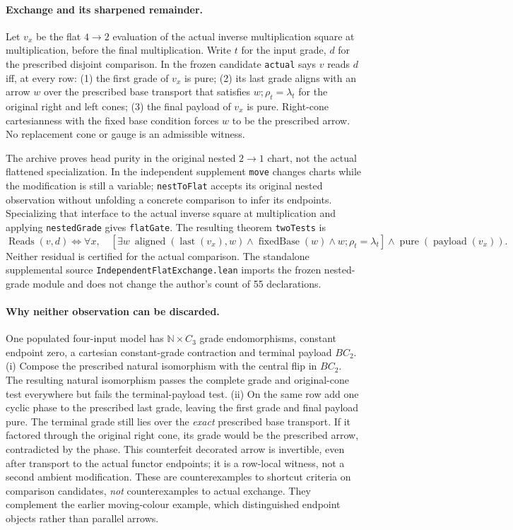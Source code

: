 \documentclass[10pt]{article}
\newcommand{\code}{\nolinkurl}\setlength{\emergencystretch}{3em}
\begin{document}
\paragraph{Exchange and its sharpened remainder.} Let $v_x$ be the flat $4\to2$ evaluation of the actual inverse multiplication square at multiplication, before the final multiplication. Write $t$ for the input grade, $d$ for the prescribed disjoint comparison. In the frozen candidate \code{actual} says $v$ reads $d$ iff, at every row: (1) the first grade of $v_x$ is pure; (2) its last grade aligns with an arrow $w$ over the prescribed base transport that satisfies $w;\rho_t=\lambda_t$ for the original right and left cones; (3) the final payload of $v_x$ is pure. Right-cone cartesianness with the fixed base condition forces $w$ to be the prescribed arrow. No replacement cone or gauge is an admissible witness.
\par The archive proves head purity in the original nested $2\to1$ chart, not the actual flattened specialization. In the independent supplement \code{move} changes charts while the modification is still a variable; \code{nestToFlat} accepts its original nested observation without unfolding a concrete comparison to infer its endpoints. Specializing that interface to the actual inverse square at multiplication and applying \code{nestedGrade} gives \code{flatGate}. The resulting theorem \code{twoTests} is
\[
 \operatorname{Reads}(v,d)\iff \forall x,\quad
 \left[\exists w\ \operatorname{aligned}(\operatorname{last}(v_x),w)
 \land\operatorname{fixedBase}(w)\land w;\rho_t=\lambda_t\right]
 \land\operatorname{pure}(\operatorname{payload}(v_x)).
\]
Neither residual is certified for the actual comparison. The standalone supplemental source \code{IndependentFlatExchange.lean} imports the frozen nested-grade module and does not change the author's count of 55 declarations.
\paragraph{Why neither observation can be discarded.} One populated four-input model has $\mathbb N\times C_3$ grade endomorphisms, constant endpoint zero, a cartesian constant-grade contraction and terminal payload $BC_2$. (i) Compose the prescribed natural isomorphism with the central flip in $BC_2$. The resulting natural isomorphism passes the complete grade and original-cone test everywhere but fails the terminal-payload test. (ii) On the same row add one cyclic phase to the prescribed last grade, leaving the first grade and final payload pure. The terminal grade still lies over the \emph{exact} prescribed base transport. If it factored through the original right cone, its grade would be the prescribed arrow, contradicted by the phase. This counterfeit decorated arrow is invertible, even after transport to the actual functor endpoints; it is a row-local witness, not a second ambient modification. These are counterexamples to shortcut criteria on comparison candidates, \emph{not} counterexamples to actual exchange. They complement the earlier moving-colour example, which distinguished endpoint objects rather than parallel arrows.
\end{document}
